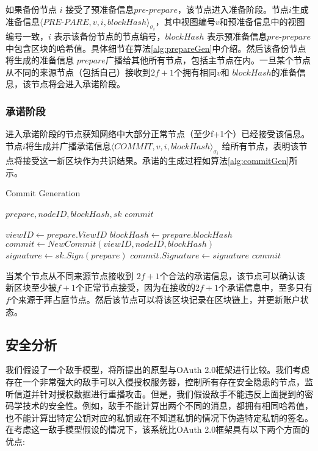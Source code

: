 如果备份节点 $i$ 接受了预准备信息$pre$-$prepare$，该节点进入准备阶段。节点$i$生成准备信息$\langle PRE$-$PARE, v, i, blockHash\rangle_{\sigma_{i}}$，其中视图编号$v$和预准备信息中的视图编号一致，$i$ 表示该备份节点的节点编号，$blockHash$ 表示预准备信息$pre$-$prepare$中包含区块的哈希值。具体细节在算法\ref{alg:prepareGen}中介绍。然后该备份节点将生成的准备信息 $prepare$广播给其他所有节点，包括主节点在内。一旦某个节点从不同的来源节点（包括自己）接收到$2f+1$个拥有相同$v$和 $blockHash$的准备信息，该节点将会进入承诺阶段。

\subsubsection{承诺阶段}

进入承诺阶段的节点获知网络中大部分正常节点（至少f+1个）已经接受该信息。节点$i$将生成并广播承诺信息$\langle COMMIT, v, i, blockHash \rangle_{\sigma_{i}}$ 给所有节点，表明该节点将接受这一新区块作为共识结果。承诺的生成过程如算法\ref{alg:commitGen}所示。

 \begin{algorithm}
 \caption{Commit Generation}
   \begin{algorithmic}[H]\label{alg:commitGen}
   \renewcommand{\algorithmicrequire}{\textbf{Input:}}
   \renewcommand{\algorithmicensure}{\textbf{Output:}}
   \REQUIRE $prepare, nodeID, blockHash, sk$
   \ENSURE  $commit$

    \STATE $viewID \gets prepare.ViewID$
    \STATE $blockHash \gets prepare.blockHash$
    \STATE $commit \gets NewCommit(viewID, nodeID, blockHash)$
    \STATE $signature \gets sk.Sign(prepare)$
    \STATE $commit.Signature \gets signature$
   \RETURN $commit$
   \end{algorithmic}
 \end{algorithm}

当某个节点从不同来源节点接收到 $2f+1$个合法的承诺信息，该节点可以确认该新区块至少被$f+1$个正常节点接受，因为在接收的$2f+1$个承诺信息中，至多只有$f$个来源于拜占庭节点。然后该节点可以将该区块记录在区块链上，并更新账户状态。

\subsection{安全分析}

我们假设了一个敌手模型，将所提出的原型与OAuth 2.0框架进行比较。我们考虑存在一个非常强大的敌手可以入侵授权服务器，控制所有存在安全隐患的节点，监听信道并针对授权数据进行重播攻击。但是，我们假设敌手不能违反上面提到的密码学技术的安全性。例如，敌手不能计算出两个不同的消息，都拥有相同哈希值，也不能计算出特定公钥对应的私钥或在不知道私钥的情况下伪造特定私钥的签名。在考虑这一敌手模型假设的情况下，该系统比OAuth 2.0框架具有以下两个方面的优点:

